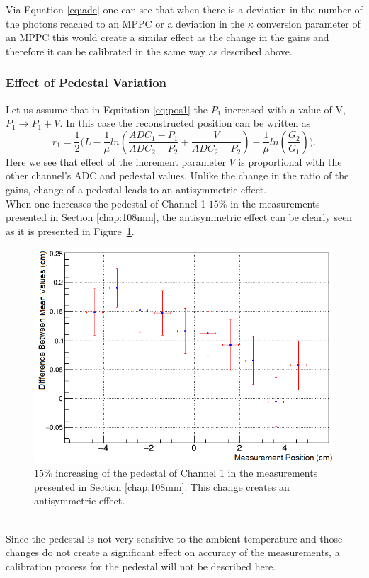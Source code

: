 \documentclass[a4paper]{article}\linespread{1.4}
\begin{document}
Via Equation \ref{eq:adc} one can see that when there is a deviation in the number of the photons reached to an MPPC or a deviation in the $\kappa$ conversion parameter of an MPPC this would create a similar effect as the change in the gains and therefore it can be calibrated in the same way as described above.

\subsubsection{Effect of Pedestal Variation}
Let us assume that in Equitation \ref{eq:pos1} the $P_{1}$ increased with a value of V, $P_{1}\to P_{1}+V$. 
In this case the reconstructed position can be written as
\begin{equation} \label{eq:pos2} r_{1}=\frac{1}{2} \Big(L - \frac{1}{\mu} ln(\frac{ADC_{1} - P_{1} }{ADC_{2} - P_{2}}+\frac{ V }{ADC_{2} - P_{2}}) - \frac{1}{\mu} ln(\frac{G_{2}}{G_{1}})\Big) . \end{equation}
Here we see that effect of the increment parameter $V$ is proportional with the other channel's ADC and pedestal values. Unlike the change in the ratio of the gains, change of a pedestal leads to an antisymmetric effect.
\\When one increases the pedestal of Channel 1 $15\%$ in the measurements presented in Section \ref{chap:108mm}, the antisymmetric effect can be clearly seen as it is presented in Figure~\ref{fig:pedc}.
\begin{figure}[h!] \hspace*{-1cm} \includegraphics[width=130mm,scale=2.0]{figures/pedc.png} \caption{$15\%$ increasing of  the pedestal of Channel 1 in the measurements presented in Section \ref{chap:108mm}. This change creates an antisymmetric effect.}  \label{fig:pedc}\end{figure}
\\Since the pedestal is not very sensitive to the ambient temperature and those changes do not create a significant effect on accuracy of the measurements, 
a calibration process for the pedestal will not be described here.
\end{document}
